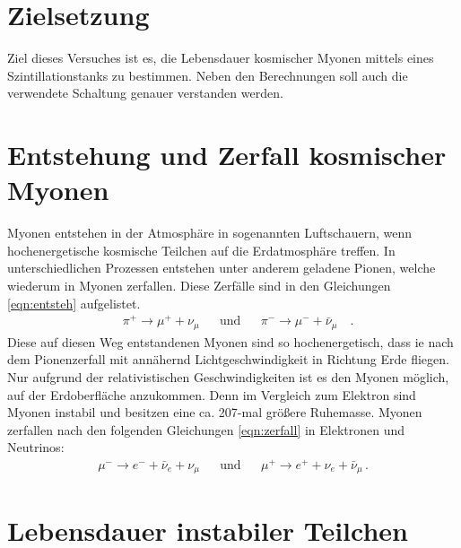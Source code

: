 \section{Zielsetzung}
    \setcounter{page}{1}
    Ziel dieses Versuches ist es, die Lebensdauer kosmischer Myonen mittels eines Szintillationstanks zu bestimmen. 
    Neben den Berechnungen soll auch die verwendete Schaltung genauer verstanden werden.

    \section{Entstehung und Zerfall kosmischer Myonen}
        Myonen entstehen in der Atmosphäre in sogenannten Luftschauern, wenn hochenergetische kosmische Teilchen auf die Erdatmosphäre treffen.
        In unterschiedlichen Prozessen entstehen unter anderem geladene Pionen, welche wiederum in Myonen zerfallen.
        Diese Zerfälle sind in den Gleichungen \ref{eqn:entsteh} aufgelistet.
        \begin{align}
            &\pi^+ \rightarrow \mu^+ + \nu_\mu && \text{und} && \pi^- \rightarrow \mu^- + \bar{\nu}_\mu \quad .
            \label{eqn:entsteh}
        \end{align}
        Diese auf diesen Weg entstandenen Myonen sind so hochenergetisch, 
        dass ie nach dem Pionenzerfall mit annähernd Lichtgeschwindigkeit in Richtung Erde fliegen.
        Nur aufgrund der relativistischen Geschwindigkeiten ist es den Myonen möglich, auf der Erdoberfläche anzukommen. 
        Denn im Vergleich zum Elektron sind Myonen instabil und besitzen eine ca. 207-mal größere Ruhemasse. 
        Myonen zerfallen nach den folgenden Gleichungen \ref{eqn:zerfall} in Elektronen und Neutrinos:
        \begin{align}
            \mu^- \rightarrow e^- + \bar{\nu}_e + \nu_\mu && \text{und} &&  \mu^+ \rightarrow e^+ + \nu_e + \bar{\nu}_\mu \, .
            \label{eqn:zerfall} 
        \end{align} 

    \section{Lebensdauer instabiler Teilchen}

